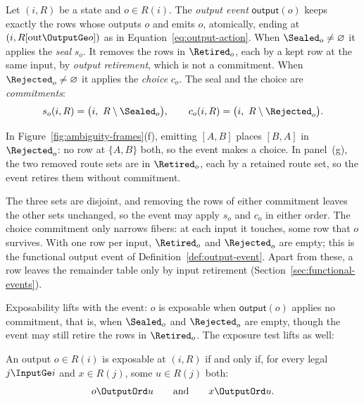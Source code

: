 \begin{definition}
\label{def:lifted-output-event}
\label{def:output-retirement}
Let $(i,R)$ be a state and $o\in R(i)$.  The \emph{output event}
$\mathsf{output}(o)$ keeps exactly the rows whose outputs \outrelbase $o$ and
emits $o$, atomically, ending at $(i,R[\mathrm{out}\OutputGe o])$ as in
Equation~\ref{eq:output-action}.  When $\Sealed_o\neq\varnothing$ it applies the \emph{seal} $s_o$.  It removes
the rows in $\Retired_o$, each \outrelpast by a kept row at the same input, by
\emph{output retirement}, which is not a commitment.  When
$\Rejected_o\neq\varnothing$ it applies the \emph{choice} $c_o$.  The seal and
the choice are \emph{commitments}:
\begin{equation}
  s_o(i,R)=\bigl(i,\ R\setminus\Sealed_o\bigr),
  \qquad
  c_o(i,R)=\bigl(i,\ R\setminus\Rejected_o\bigr).
  \label{eq:canonical-seal-commitment-relational}
\end{equation}
\end{definition}

In Figure~\ref{fig:ambiguity-frames}(f), emitting $[A,B]$ places $[B,A]$ in
$\Rejected_o$: no row at $\{A,B\}$ \outrel both, so the event makes a choice.  In
panel~(g), the two removed route
sets are in $\Retired_o$, each \outrelpast by a retained route set, so the event retires
them without commitment.

The three sets are disjoint, and removing the rows of either commitment leaves
the other sets unchanged, so the event may apply $s_o$ and $c_o$ in either
order.  The choice commitment only narrows fibers: at each input it touches, some row
that \outrel $o$ survives.  With one row per input, $\Retired_o$ and $\Rejected_o$
are empty; this is the functional output event of
Definition~\ref{def:output-event}.  Apart from these, a row leaves the
remainder table only by input retirement (Section~\ref{sec:functional-events}).

Exposability lifts with the event: $o$ is exposable when $\mathsf{output}(o)$
applies no commitment, that is, when $\Sealed_o$ and $\Rejected_o$ are empty, though the
event may still retire the rows in $\Retired_o$.  The exposure test lifts as well:

\begin{proposition}
\label{prop:exposability}
An output $o\in R(i)$ is exposable at $(i,R)$ if and only if, for every legal
$j\InputGe i$ and $x\in R(j)$, some $u\in R(j)$ \outrel both:
\begin{equation}
  o\OutputOrd u
  \qquad\text{and}\qquad
  x\OutputOrd u.
  \label{eq:safe-exposure}
\end{equation}
\end{proposition}

